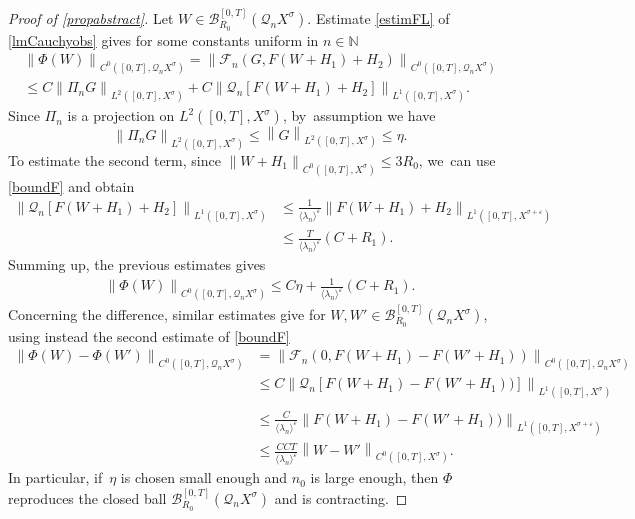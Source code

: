 \documentclass[11pt]{article}
\theoremstyle{definition}
\let\mc\mathcal
\let\veps\varepsilon
\newcommand{\B}{\mc{B}}
\newcommand{\N}{\mathbb{N}}
\newcommand{\Q}{\mathcal{Q}}
\providecommand{\inn}[1]{\langle#1\rangle}
\newcommand\nor[2]{\left\|#1\right\|_{#2}}
\newcommand\FL{\mathcal{F}_{n}}
\begin{document}
\begin{proof}[Proof of \cref{propabstract}]
Let $W\in \B_{R_{0}}^{[0,T]}(\Q_n X^{\sigma})$. Estimate \eqref{estimFL} of \cref{lmCauchyobs} gives for some constants uniform in $n\in \N$\vspace*{-5pt}
\begin{multline*}
\nor{\Phi(W)}{C^{0}([0,T],\Q_{n}X^{\sigma})}=\nor{\FL(G,F(W+H_{1})+H_{2})}{C^{0}([0,T],\Q_{n}X^{\sigma})}\\
\leq C \nor{\Pi_{n}G}{L^{2}([0,T],X^{\sigma})}+C\nor{\Q_{n}\left[ F(W+H_{1})+H_{2}\right]}{L^{1}([0,T],X^{\sigma})}.
\end{multline*}
Since $\Pi_{n}$ is a projection on $L^2([0,T],X^{\sigma})$, by~assumption we have\vspace*{-3pt}
\[
\nor{\Pi_{n}G}{L^{2}([0,T],X^{\sigma})}\leq \nor{G}{L^{2}([0,T],X^{\sigma})}\leq \eta.
\]
To estimate the second term, since $\nor{W+H_{1}}{C^{0}([0,T],X^{\sigma})}\leq 3R_{0}$, we~can use \eqref{boundF} and obtain\vspace*{-3pt}
\begin{equation}\label{estimFinPhi}
\begin{aligned}
\nor{\Q_{n}\left[ F(W+H_{1})\!+\!H_{2}\right]}{L^{1}([0,T],X^{\sigma})}&\leq \frac{1}{\inn{\lambda_n}^{\veps}} \nor{F(W+H_{1})\!+\!H_{2}}{L^{1}([0,T],X^{\sigma+\veps})}\\
&\leq \frac{T}{\inn{\lambda_n}^{\veps}}(C+R_{1}).
\end{aligned}
\end{equation}
Summing up, the previous estimates gives
\begin{align*}
\nor{\Phi(W)}{C^{0}([0,T],\Q_{n}X^{\sigma})}\leq C\eta+ \frac{1}{\inn{\lambda_n}^{\veps}} \left(C+R_{1}\right).
\end{align*}
Concerning the difference, similar estimates give for $W, W'\in \B_{R_{0}}^{[0,T]}(\Q_n X^{\sigma})$, using instead the second estimate of \eqref{boundF}
\begin{align}
\nonumber\nor{\Phi(W)-\Phi(W')}{C^{0}([0,T],\Q_{n}X^{\sigma})}&=\nor{\FL(0,F(W+H_{1})-F(W'+H_{1}))}{C^{0}([0,T],\Q_{n}X^{\sigma})}\\
\nonumber&\leq C\nor{\Q_{n}\left[ F(W+H_{1})-F(W'+H_{1}))\right]}{L^{1}([0,T],X^{\sigma})}\\[-7pt]
\label{bounddiffW}\\[-10pt]
\nonumber&\leq \frac{C}{\inn{\lambda_n}^{\veps}} \nor{F(W+H_{1})-F(W'+H_{1}))}{L^{1}([0,T],X^{\sigma+\veps})}\\
\nonumber&\leq \frac{CCT}{\inn{\lambda_n}^{\veps}} \nor{W-W'}{C^{0}([0,T],X^{\sigma})}.
\end{align}
In particular, if~$\eta$ is chosen small enough and $n_{0}$ is large enough, then $\Phi$ reproduces the closed ball $\B_{R_{0}}^{[0,T]}(\Q_n X^{\sigma})$ and is contracting.


\end{proof}
\end{document}
